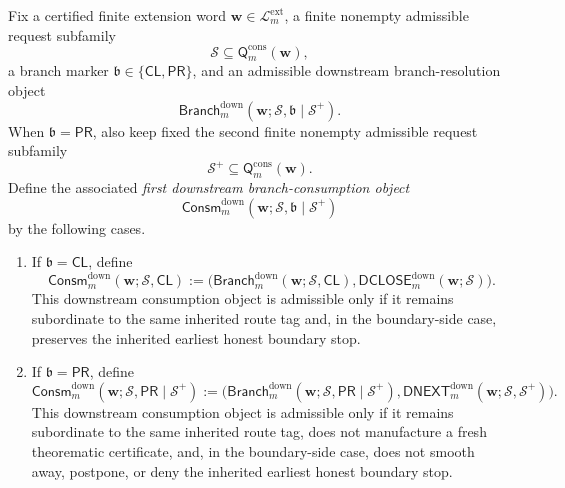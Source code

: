 \begin{definition}
\label{def:first-downstream-branch-consumption-object}
Fix a certified finite extension word \(\mathbf w\in\mathcal L^{\mathrm{ext}}_{m}\), a finite nonempty admissible request subfamily
\[
 \mathcal S \subseteq \mathsf{Q}^{\mathrm{cons}}_{m}(\mathbf w),
\]
a branch marker \(\mathfrak b\in\{\mathsf{CL},\mathsf{PR}\}\), and an admissible downstream branch-resolution object
\[
 \mathsf{Branch}^{\mathrm{down}}_{m}(\mathbf w;\mathcal S,\mathfrak b\mid\mathcal S^{+}).
\]
When \(\mathfrak b=\mathsf{PR}\), also keep fixed the second finite nonempty admissible request subfamily
\[
 \mathcal S^{+}\subseteq \mathsf{Q}^{\mathrm{cons}}_{m}(\mathbf w).
\]
Define the associated \emph{first downstream branch-consumption object}
\[
 \mathsf{Consm}^{\mathrm{down}}_{m}(\mathbf w;\mathcal S,\mathfrak b\mid\mathcal S^{+})
\]
by the following cases.
\begin{enumerate}[label=(\roman*)]
 \item If \(\mathfrak b=\mathsf{CL}\), define
\[
 \mathsf{Consm}^{\mathrm{down}}_{m}(\mathbf w;\mathcal S,\mathsf{CL})
 :=
 \bigl(
 \mathsf{Branch}^{\mathrm{down}}_{m}(\mathbf w;\mathcal S,\mathsf{CL}),
 \mathsf{DCLOSE}^{\mathrm{down}}_{m}(\mathbf w;\mathcal S)
 \bigr).
\]
This downstream consumption object is admissible only if it remains subordinate to the same inherited route tag and, in the boundary-side case, preserves the inherited earliest honest boundary stop.

 \item If \(\mathfrak b=\mathsf{PR}\), define
\[
 \mathsf{Consm}^{\mathrm{down}}_{m}(\mathbf w;\mathcal S,\mathsf{PR}\mid\mathcal S^{+})
 :=
 \bigl(
 \mathsf{Branch}^{\mathrm{down}}_{m}(\mathbf w;\mathcal S,\mathsf{PR}\mid\mathcal S^{+}),
 \mathsf{DNEXT}^{\mathrm{down}}_{m}(\mathbf w;\mathcal S,\mathcal S^{+})
 \bigr).
\]
This downstream consumption object is admissible only if it remains subordinate to the same inherited route tag, does not manufacture a fresh theorematic certificate, and, in the boundary-side case, does not smooth away, postpone, or deny the inherited earliest honest boundary stop.
\end{enumerate}
\end{definition}

